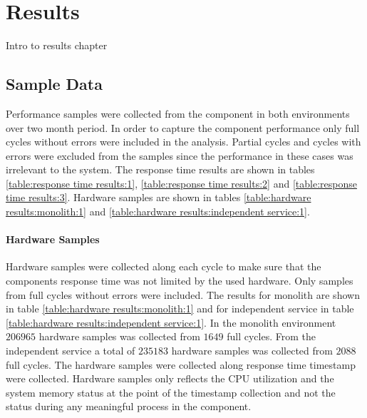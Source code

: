 \chapter{Results\label{results}}
Intro to results chapter

\section{Sample Data}
Performance samples were collected from the component in both environments over two month period.
In order to capture the component performance only full cycles without errors were included in the analysis.
Partial cycles and cycles with errors were excluded from the samples since the performance in these cases was irrelevant to the system.
The response time results are shown in tables \ref{table:response time results:1}, \ref{table:response time results:2} and \ref{table:response time results:3}. Hardware samples are shown in tables \ref{table:hardware results:monolith:1} and \ref{table:hardware results:independent service:1}.

\subsubsection{Hardware Samples}
Hardware samples were collected along each cycle to make sure that the components response time was not limited by the used hardware.
Only samples from full cycles without errors were included.
The results for monolith are shown in table \ref{table:hardware results:monolith:1} and for independent service in table \ref{table:hardware results:independent service:1}.
In the monolith environment $206965$ hardware samples was collected from $1649$ full cycles.
From the independent service a total of $235183$ hardware samples was collected from $2088$ full cycles.
The hardware samples were collected along response time timestamp were collected.
Hardware samples only reflects the CPU utilization and the system memory status at the point of the timestamp collection and not the status during any meaningful process in the component.

